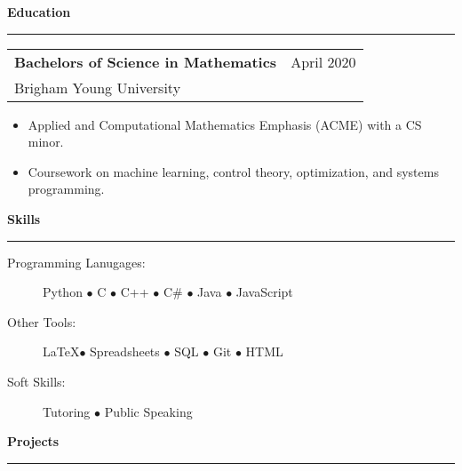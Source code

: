 \documentclass[12pt]{article}
\newenvironment{compactItemize}{
  \begin{itemize}[itemsep=0ex, parsep=0ex, partopsep=0ex, topsep= -7pt]
}{
  \end{itemize}
}
\newcommand{\jobInfo}[4]{
  \begingroup
  \setlength{\tabcolsep}{0ex}
  \begin{tabularx}{\linewidth}{X r}
    #1 & %
    #2\\ %
    #3 & %
    #4   %
  \end{tabularx}%
  \endgroup%
}
\newcommand{\degree}[4]{
  \jobInfo{\textbf{#1}}{#2}{#3}{#4}
}
\begin{document}
\begin{comment}
\jobInfo{Landscape Maintenance Crewmember}{K\&M Strategic Management}{Hemet, CA}{Summer 2011 and May 2012 -- January 2013}
\begin{compactItemize}
  \item Leaf-blew the parking lots and picked up trash at managed medical properties every morning.
  \item Weeded, raked, and maintained the landscape at properties.
  \item Cleaned out an empty strip mall in preparation for sale.
  \item Repainted fences, parking lines, and breakrooms.
\end{compactItemize}
\medskip
\end{comment}

\textbf{Education}
\smallskip
\hrule

\degree{Bachelors of Science in Mathematics}{April 2020}{Brigham Young University}{}%
%
\begin{compactItemize}
  \item Applied and Computational Mathematics Emphasis (ACME) with a CS minor.
  \item Coursework on machine learning, control theory, optimization, and systems programming.
\end{compactItemize}
\begin{comment}
\smallskip
\textbf{Course Work and Topics}
  \begin{center}
    Analysis
    $\bullet$ Algorithm Design
    $\bullet$ Optimization
    $\bullet$ Control Theory
    \newline Machine Learning
    $\bullet$ Data Structures
    $\bullet$ Systems Programming
    $\bullet$ Applications Programming
  \end{center}
\end{comment}

\textbf{Skills}
\smallskip
\hrule
\begin{description}
  \item[Programming Lanugages:]   Python $\bullet$ C $\bullet$ C++ $\bullet$ C\# $\bullet$ Java $\bullet$ JavaScript
  \item [Other Tools:]     \LaTeX $\bullet$ Spreadsheets $\bullet$ SQL $\bullet$ Git $\bullet$ HTML
  \item [Soft Skills:] Tutoring $\bullet$ Public Speaking
\end{description}

\textbf{Projects %
}
\smallskip
\hrule
\end{document}
